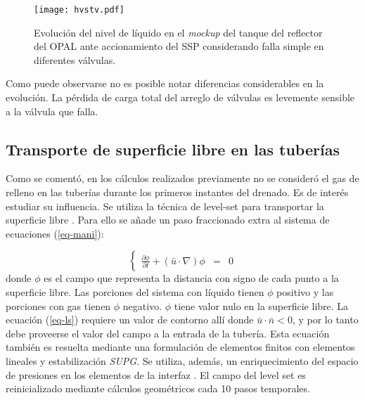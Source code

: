 \begin{figure}[ht]
\centering
\texttt{[image: hvstv.pdf]}
\caption[Evolución del nivel de líquido en el \textit{mockup} del tanque del reflector del OPAL ante accionamiento del SSP considerando falla simple en diferentes válvulas]
{Evolución del nivel de líquido en el \textit{mockup} del tanque del reflector del OPAL ante accionamiento del SSP considerando falla simple en diferentes válvulas.}
\label{hvstv} 
\end{figure}

Como puede observarse no es posible notar diferencias considerables en la evolución.
La pérdida de carga total del arreglo de válvulas es levemente sensible a la válvula que falla.

\subsection*{Transporte de superficie libre en las tuberías}
\label{3:level-set}

Como se comentó, en los cálculos realizados previamente no se consideró el gas de relleno en las tuberías durante los primeros instantes del drenado.
Es de interés estudiar su influencia.
Se utiliza la técnica de level-set para transportar la superficie libre \cite{level-set}.
Para ello se añade un paso fraccionado extra al sistema de ecuaciones (\ref{eq-mani}):

\begin{equation}
\left\{ \begin{array}{rcl}
\displaystyle \frac{\partial\phi}{\partial t}+ (\bar{u} \cdot \nabla) \phi &=& 0
\label{eq-ls}
\end{array} \right.
\end{equation}
donde $\phi$ es el campo que representa la distancia con signo de cada punto a la superficie libre.
Las porciones del sistema con líquido tienen $\phi$ positivo y las porciones con gas tienen $\phi$ negativo.
$\phi$ tiene valor nulo en la superficie libre.
La ecuación (\ref{eq-ls}) requiere un valor de contorno allí donde $\bar{u} \cdot \bar{n} < 0$,
y por lo tanto debe proveerse el valor del campo a la entrada de la tubería.
Esta ecuación también es resuelta mediante una formulación de elementos finitos con elementos lineales y estabilización \textit{SUPG}.
Se utiliza, además, un enriquecimiento del espacio de presiones en los elementos de la interfaz \cite{enriq}.
El campo del level set es reinicializado mediante cálculos geométricos cada 10 pasos temporales.


